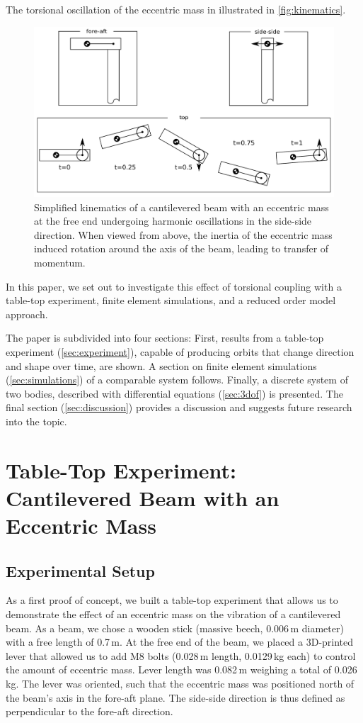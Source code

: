\documentclass{article}
\begin{document}
The torsional oscillation of the eccentric mass in illustrated in \autoref{fig:kinematics}.

\begin{figure}
    \centering
    \includegraphics[width=0.7\linewidth]{figures/kinematics_3.pdf}
    \caption{Simplified kinematics of a cantilevered beam with an eccentric mass at the free end undergoing harmonic oscillations in the side-side direction. When viewed from above, the inertia of the eccentric mass induced rotation around the axis of the beam, leading to transfer of momentum.}
    \label{fig:kinematics}
\end{figure}

In this paper, we set out to investigate this effect of torsional coupling with a table-top experiment, finite element simulations, and a reduced order model approach. 

The paper is subdivided into four sections: First, results from a table-top experiment (\autoref{sec:experiment}), capable of producing orbits that change direction and shape over time, are shown. A section on finite element simulations (\autoref{sec:simulations}) of a comparable system follows. Finally, a discrete system of two bodies, described with differential equations (\autoref{sec:3dof}) is presented. The final section (\autoref{sec:discussion}) provides a discussion and suggests future research into the topic. 

\clearpage

\section{Table-Top Experiment: Cantilevered Beam with an Eccentric Mass}
\label{sec:experiment}

\subsection{Experimental Setup}

As a first proof of concept, we built a table-top experiment that allows us to demonstrate the effect of an eccentric mass on the vibration of a cantilevered beam. As a beam, we chose a wooden stick (massive beech, 0.006\,m diameter) with a free length of 0.7\,m. At the free end of the beam, we placed a 3D-printed lever that allowed us to add M8 bolts (0.028\,m length, 0.0129\,kg each) to control the amount of eccentric mass. Lever length was 0.082\,m weighing a total of 0.026\,kg. The lever was oriented, such that the eccentric mass was positioned north of the beam's axis in the fore-aft plane. The side-side direction is thus defined as perpendicular to the fore-aft direction. 
\end{document}
